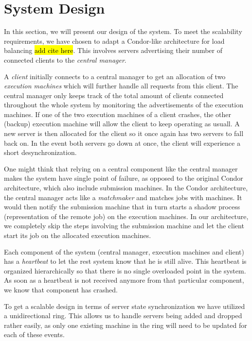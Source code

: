 \documentclass[a4paper,10pt]{article}
\begin{document}
\section{System Design}
\label{sec:design}

In this section, we will present our design of the system.
To meet the scalability requirements, we have chosen to adapt a Condor-like architecture for load balancing \hl{add cite here}.
This involves servers advertising their number of connected clients to the \emph{central manager}.

A \emph{client} initially connects to a central manager to get an allocation of two \emph{execution machines} which will further handle all requests from this client.
The central manager only keeps track of the total amount of clients connected throughout the whole system by monitoring the advertisements of the execution machines.
If one of the two execution machines of a client crashes, the other (backup) execution machine will allow the client to keep operating as usuall.
A new server is then allocated for the client so it once again has two servers to fall back on.
In the event both servers go down at once, the client will experience a short desynchronization.

One might think that relying on a central component like the central manager makes the system have single point of failure,
as opposed to the original Condor architecture, which also include submission machines.
In the Condor architecture, the central manager acts like a \emph{matchmaker} and matches jobs with machines.
It would then notify the submission machine that in turn starts a shadow process (representation of the remote job) on the execution machines.
In our architecture, we completely skip the steps involving the submission machine and let the client start its job on the allocated execution machines.

Each component of the system (central manager, execution machines and client) has a \emph{heartbeat} to let the rest system know that he is still alive.
This heartbeat is organized hierarchically so that there is no single overloaded point in the system.
As soon as a heartbeat is not received anymore from that particular component, we know that component has crashed.

To get a scalable design in terms of server state synchronization we have utilized a unidirectional ring.
This allows us to handle servers being added and dropped rather easily, as only one existing machine in the ring
will need to be updated for each of these events.
\end{document}
